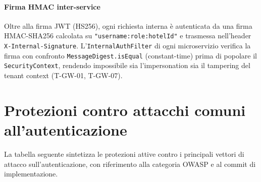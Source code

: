 ﻿\documentclass[a4paper,12pt]{report}
\begin{document}
\paragraph{Firma HMAC inter-service}
Oltre alla firma JWT (HS256), ogni richiesta interna è autenticata da una firma
HMAC-SHA256 calcolata su \texttt{"username:role:hotelId"} e trasmessa nell'header
\texttt{X-Internal-Signature}. L'\texttt{InternalAuthFilter} di ogni microservizio
verifica la firma con confronto \texttt{MessageDigest.isEqual} (constant-time)
prima di popolare il \texttt{SecurityContext}, rendendo impossibile sia
l'impersonation sia il tampering del tenant context (T-GW-01, T-GW-07).

\section{Protezioni contro attacchi comuni all'autenticazione}

La tabella seguente sintetizza le protezioni attive contro i principali vettori
di attacco sull'autenticazione, con riferimento alla categoria OWASP e al commit
di implementazione.
\end{document}
